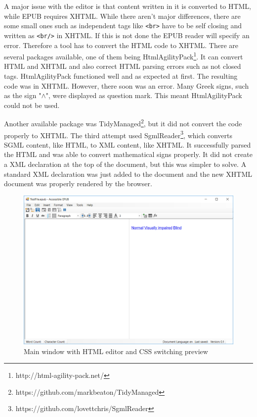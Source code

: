A major issue with the editor is that content written in it is converted to HTML, while EPUB requires XHTML. While there aren't major differences, there are some small ones such as independent tags like \lstinline|<br>| have to be self closing and written as \lstinline|<br/>| in XHTML. If this is not done the EPUB reader will specify an error. Therefore a tool has to convert the HTML code to XHTML. There are several packages available, one of them being HtmlAgilityPack\footnote{http://html-agility-pack.net/}. It can convert HTML and XHTML and also correct HTML parsing errors such as not closed tags. HtmlAgilityPack functioned well and as expected at first. The resulting code was in XHTML. However, there soon was an error. Many Greek signs, such as the sign "$\wedge$", were displayed as question mark. This meant HtmlAgilityPack could not be used. 

Another available package was TidyManaged\footnote{https://github.com/markbeaton/TidyManaged}, but it did not convert the code properly to XHTML. The third attempt used SgmlReader\footnote{https://github.com/lovettchris/SgmlReader}, which converts SGML content, like HTML, to XML content, like XHTML. It successfully parsed the HTML and was able to convert mathematical signs properly. It did not create a XML declaration at the top of the document, but this was simpler to solve. A standard XML declaration was just added to the document and the new XHTML document was properly rendered by the browser.


\begin{figure}
	\begin{center}
		\includegraphics[width=\linewidth]{figures/formCss.png}	
		\caption{Main window with HTML editor and CSS switching preview}
		\label{fig:formCss}
	\end{center}
\end{figure}

